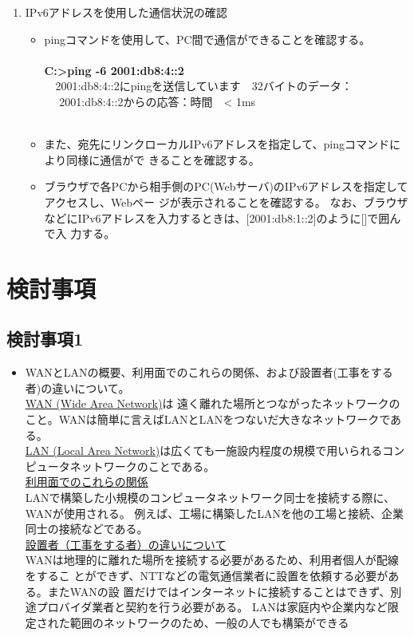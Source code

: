 \documentclass[10pt]{article}
\begin{document}
\begin{enumerate}
\begin{table}[H]
                    \end{table} 
                \endgroup
    \item IPv6アドレスを使用した通信状況の確認
        \begin{itemize}
            \item pingコマンドを使用して、PC間で通信ができることを確認する。\\\\
                  \textbf{C:>ping -6 2001:db8:4::2} \\
                　2001:db8:4::2にpingを送信しています　32バイトのデータ：\\
　                2001:db8:4::2からの応答：時間　< 1ms \\
　          \item また、宛先にリンクローカルIPv6アドレスを指定して、pingコマンドにより同様に通信がで
                    きることを確認する。 
            \item ブラウザで各PCから相手側のPC(Webサーバ)のIPv6アドレスを指定してアクセスし、Webペー
                    ジが表示されることを確認する。
                なお、ブラウザなどにIPv6アドレスを入力するときは、[2001:db8:1::2]のように[]で囲んで入
                力する。
            
        \end{itemize}
\end{enumerate}

\section{検討事項}

\subsection{検討事項1}
\begin{itemize}
    \item WANとLANの概要、利用面でのこれらの関係、および設置者(工事をする者)の違いについて。\\
    \underline{WAN (Wide Area Network)}は 遠く離れた場所とつながったネットワークのこと。WANは簡単に言えばLANとLANをつないだ大きなネットワークである。\\
    \underline{LAN (Local Area Network)}は広くても一施設内程度の規模で用いられるコンピュータネットワークのことである。 \\
    \underline{利用面でのこれらの関係}\\ LANで構築した小規模のコンピュータネットワーク同士を接続する際に、WANが使用される。 例えば、工場に構築したLANを他の工場と接続、企業同士の接続などである。 \\
    \underline{設置者（工事をする者）の違いについて }\\
    WANは地理的に離れた場所を接続する必要があるため、利用者個人が配線をするこ とができず、NTTなどの電気通信業者に設置を依頼する必要がある。またWANの設 置だけではインターネットに接続することはできず、別途プロバイダ業者と契約を行う必要がある。 
    LANは家庭内や企業内など限定された範囲のネットワークのため、一般の人でも構築ができる
\end{itemize}
\end{document}

